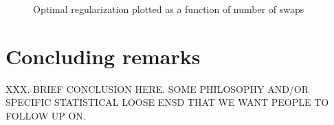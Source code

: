\documentclass[12pt]{article}
\theoremstyle{plain}
\begin{document}
\begin{figure}
    \centering
    \caption{Optimal regularization plotted as a function of number of swaps}
\end{figure}

\section{Concluding remarks}
\label{sxn:conc}

XXX.  BRIEF CONCLUSION HERE.  SOME PHILOSOPHY AND/OR SPECIFIC STATISTICAL LOOSE ENSD THAT WE WANT PEOPLE TO FOLLOW UP ON.




%

\end{document}
